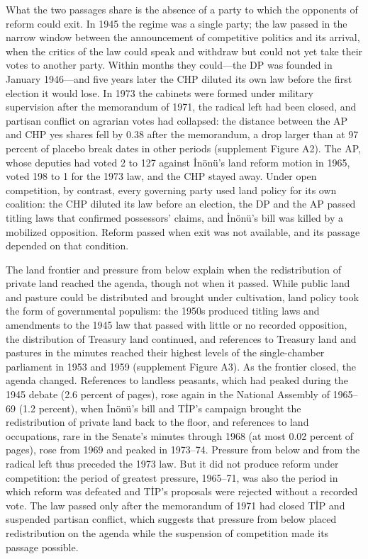 \documentclass[12pt]{article}
\begin{document}
What the two passages share is the absence of a party to which the opponents of reform could exit. In 1945 the regime was a single party; the law passed in the narrow window between the announcement of competitive politics and its arrival, when the critics of the law could speak and withdraw but could not yet take their votes to another party. Within months they could---the DP was founded in January 1946---and five years later the CHP diluted its own law before the first election it would lose. In 1973 the cabinets were formed under military supervision after the memorandum of 1971, the radical left had been closed, and partisan conflict on agrarian votes had collapsed: the distance between the AP and CHP yes shares fell by 0.38 after the memorandum, a drop larger than at 97 percent of placebo break dates in other periods (supplement Figure A2). The AP, whose deputies had voted 2 to 127 against İnönü's land reform motion in 1965, voted 198 to 1 for the 1973 law, and the CHP stayed away. Under open competition, by contrast, every governing party used land policy for its own coalition: the CHP diluted its law before an election, the DP and the AP passed titling laws that confirmed possessors' claims, and İnönü's bill was killed by a mobilized opposition. Reform passed when exit was not available, and its passage depended on that condition.

The land frontier and pressure from below explain when the redistribution of private land reached the agenda, though not when it passed. While public land and pasture could be distributed and brought under cultivation, land policy took the form of governmental populism: the 1950s produced titling laws and amendments to the 1945 law that passed with little or no recorded opposition, the distribution of Treasury land continued, and references to Treasury land and pastures in the minutes reached their highest levels of the single-chamber parliament in 1953 and 1959 (supplement Figure A3). As the frontier closed, the agenda changed. References to landless peasants, which had peaked during the 1945 debate (2.6 percent of pages), rose again in the National Assembly of 1965--69 (1.2 percent), when İnönü's bill and TİP's campaign brought the redistribution of private land back to the floor, and references to land occupations, rare in the Senate's minutes through 1968 (at most 0.02 percent of pages), rose from 1969 and peaked in 1973--74. Pressure from below and from the radical left thus preceded the 1973 law. But it did not produce reform under competition: the period of greatest pressure, 1965--71, was also the period in which reform was defeated and TİP's proposals were rejected without a recorded vote. The law passed only after the memorandum of 1971 had closed TİP and suspended partisan conflict, which suggests that pressure from below placed redistribution on the agenda while the suspension of competition made its passage possible.
\end{document}
